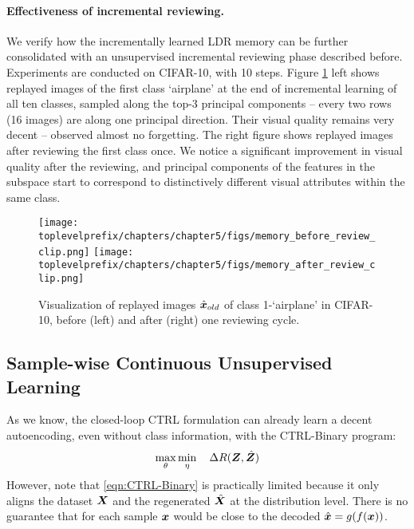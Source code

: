 \documentclass[\toplevelprefix/book-main.tex]{subfiles}
\begin{document}
\paragraph{Effectiveness of incremental reviewing.}
We verify how the incrementally learned LDR memory can be further consolidated with an unsupervised incremental reviewing phase described before. Experiments are conducted on CIFAR-10, with 10 steps. Figure \ref{fig:memory_review} left shows replayed images of the first class `airplane' at the end of incremental learning of all ten classes, sampled along the top-3 principal components -- every two rows (16 images) are along one principal direction. Their  visual quality remains very decent -- observed almost no forgetting. The right figure shows replayed images after reviewing the first class once. We notice a significant improvement in visual quality after the reviewing, and principal components of the features in the subspace start to correspond to distinctively different visual attributes within the same class.

\begin{figure}
\centering
\texttt{[image: \\toplevelprefix/chapters/chapter5/figs/memory\_before\_review\_clip.png]}
\texttt{[image: \\toplevelprefix/chapters/chapter5/figs/memory\_after\_review\_clip.png]}
 \caption{\small Visualization of replayed images $\hat{\bm{x}}_{old}$ of class 1-`airplane' in CIFAR-10, before (left) and after (right) one reviewing cycle.} 
\label{fig:memory_review}
\end{figure}


\subsection{Sample-wise Continuous Unsupervised Learning}
\label{sec:sample-wise-incremental}

As we know, the closed-loop CTRL formulation can already learn a decent autoencoding, even without class information, with the  CTRL-Binary program:
\begin{align}
      \max_\theta \min_\eta \quad \Delta R(\bm{Z}, \hat{\bm{Z}}) 
 \label{eqn:CTRL-Binary}
\end{align}
However, note that \eqref{eqn:CTRL-Binary} is practically limited because it only aligns the dataset $\bm{X}$ and the regenerated $\hat {\bm{X}}$ at the distribution level. 
There is no guarantee that for each sample $\bm{x}$ would be close to the decoded $\hat {\bm{x}} = g(f(\bm{x}))$. 
\end{document}
